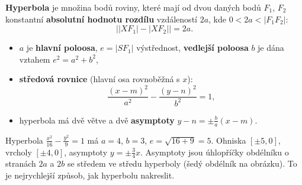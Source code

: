 \begin{definitionbox}
  \textbf{Hyperbola} je množina bodů roviny, které mají od dvou daných bodů $F_1$, $F_2$ konstantní \textbf{absolutní hodnotu rozdílu} vzdáleností $2a$, kde $0 < 2a < |F_1F_2|$:
  \begin{equation*}
    \big||XF_1| - |XF_2|\big| = 2a.
  \end{equation*}
  \begin{itemize}
    \item $a$ je \textbf{hlavní poloosa}, $e = |SF_1|$ výstřednost, \textbf{vedlejší poloosa} $b$ je dána vztahem $e^2 = a^2 + b^2$,
    \item \textbf{středová rovnice} (hlavní osa rovnoběžná s $x$):
    \begin{equation*}
      \frac{{(x - m)}^2}{a^2} - \frac{{(y - n)}^2}{b^2} = 1,
    \end{equation*}
    \item hyperbola má dvě větve a dvě \textbf{asymptoty} $y - n = \pm\frac{b}{a}(x - m)$.
  \end{itemize}
\end{definitionbox}

\begin{center}
\end{center}

\begin{example}
  Hyperbola $\frac{x^2}{16} - \frac{y^2}{9} = 1$ má $a = 4$, $b = 3$, $e = \sqrt{16 + 9} = 5$. Ohniska $[\pm 5, 0]$, vrcholy $[\pm 4, 0]$, asymptoty $y = \pm\frac{3}{4}x$. Asymptoty jsou úhlopříčky obdélníku o stranách $2a$ a $2b$ se středem ve středu hyperboly (šedý obdélník na obrázku). To je nejrychlejší způsob, jak hyperbolu nakreslit.
\end{example}

